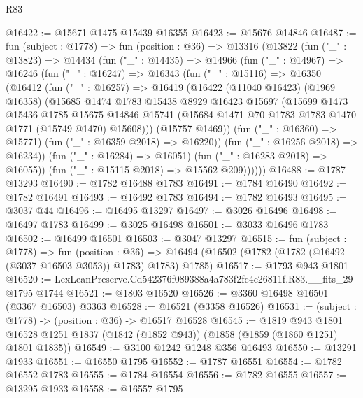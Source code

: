 \begin{lexlean}{R83}
\begin{coremodule}
@16422 := @15671 @1475 @15439 @16355
@16423 := @15676 @14846
@16487 := fun (subject : @1778) =>
  fun (position : @36) =>
  @13316
    (@13822
      (fun ("_" : @13823) =>
      @14434
        (fun ("_" : @14435) =>
        @14966
          (fun ("_" : @14967) =>
          @16246
            (fun ("_" : @16247) =>
            @16343
              (fun ("_" : @15116) =>
              @16350
                (@16412
                  (fun ("_" : @16257) =>
                  @16419
                    (@16422
                      (@11040 @16423)
                      (@1969 @16358)
                      (@15685
                        @1474
                        @1783
                        @15438
                        @8929
                        @16423
                        @15697
                        (@15699
                          @1473
                          @15436
                          @1785
                          @15675
                          @14846
                          @15741
                          (@15684 @1471 @70 @1783 @1783 @1470 @1771 (@15749 @1470) @15608)))
                      (@15757 @1469))
                    (fun ("_" : @16360) => @15771)
                    (fun ("_" : @16359 @2018) => @16220))
                  (fun ("_" : @16256 @2018) => @16234))
                (fun ("_" : @16284) => @16051)
                (fun ("_" : @16283 @2018) => @16055))
              (fun ("_" : @15115 @2018) => @15562 @209))))))
@16488 := @1787 @13293
@16490 := @1782 @16488 @1783
@16491 := @1784 @16490
@16492 := @1782 @16491
@16493 := @16492 @1783
@16494 := @1782 @16493
@16495 := @3037 @44
@16496 := @16495 @13297
@16497 := @3026 @16496
@16498 := @16497 @1783
@16499 := @3025 @16498
@16501 := @3033 @16496 @1783
@16502 := @16499 @16501
@16503 := @3047 @13297
@16515 := fun (subject : @1778) =>
  fun (position : @36) =>
  @16494 (@16502 (@1782 (@1782 (@16492 (@3037 @16503 @3053)) @1783) @1783) @1785)
@16517 := @1793 @943 @1801
@16520 := LexLeanPreserve.Cd542376f089388a4a783f2fc4c26811f.R83.__fits_29 @1795 @1744
@16521 := @1803 @16520
@16526 := @3360 @16498 @16501 (@3367 @16503) @3363
@16528 := @16521 (@3358 @16526)
@16531 := (subject : @1778) -> (position : @36) -> @16517 @16528
@16545 := @1819
    @943
    @1801
    @16528
    @1251
    @1837
    (@1842 (@1852 @943))
    (@1858 (@1859 (@1860 @1251) @1801 @1835))
@16549 := @3100 @1242 @1248 @356 @16493
@16550 := @13291 @1933
@16551 := @16550 @1795
@16552 := @1787 @16551
@16554 := @1782 @16552 @1783
@16555 := @1784 @16554
@16556 := @1782 @16555
@16557 := @13295 @1933
@16558 := @16557 @1795

\end{coremodule}
\end{lexlean}
